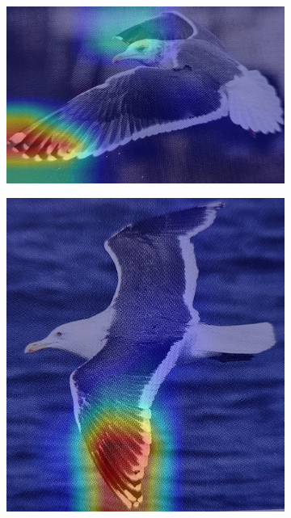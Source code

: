 \documentclass[a4paper,12pt]{report}
\begin{document}
\begin{figure}[htbp]
\begin{subfigure}[b]{0.22\textwidth}
        \includegraphics[width=\textwidth]{images/interpretability/vgg/bird4.jpg}
        \caption{}
    \end{subfigure}
    \hfill
    \begin{subfigure}[b]{0.22\textwidth}
        \includegraphics[width=\textwidth]{images/interpretability/vgg/bird5.jpg}
        \caption{}
    \end{subfigure}
    

\end{figure}
\end{document}
